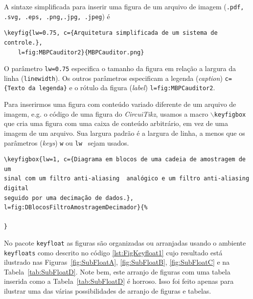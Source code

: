 {A sintaxe simplificada para inserir uma figura de um arquivo de imagem (\texttt{.pdf, .svg, .eps, .png,.jpg, .jpeg}) é
\begin{lstlisting}[language={[Latex]Tex},frame=single]
\keyfig{lw=0.75, c={Arquitetura simplificada de um sistema de controle.},
	l=fig:MBPCauditor2}{MBPCauditor.png}
 \end{lstlisting}

O parâmetro \texttt{lw=0.75} especifica o tamanho da figura em relação a largura da linha (\texttt{linewidth}). Os outros parâmetros  especificam a legenda (\emph{caption}) \texttt{c=\{Texto da legenda\}} e o rótulo da figura (\emph{label}) \texttt{l=fig:MBPCauditor2}.


Para inserirmos uma figura com conteúdo variado diferente de um arquivo de imagem, e.g. o código de uma figura do \emph{CircuiTikz}, usamos a macro \texttt{$\backslash$keyfigbox} que cria uma figura com uma caixa de conteúdo arbitrário, em vez de uma imagem de um arquivo. Sua largura padrão é a largura de linha, a menos que os parâmetros (\emph{keys}) \texttt{w} ou \texttt{lw } sejam usados.
\begin{lstlisting}[language={[Latex]Tex},frame=single,numbers =none]
\keyfigbox{lw=1, c={Diagrama em blocos de uma cadeia de amostragem de um
sinal com um filtro anti-aliasing  analógico e um filtro anti-aliasing digital 
seguido por uma decimação de dados.}, l=fig:DBlocosFiltroAmostragemDecimador}{%
	
}
\end{lstlisting}


No pacote \verb|keyfloat| as figuras são organizadas ou  arranjadas  usando  o ambiente \verb|keyfloats| como descrito no código \ref{lst:FigKeyfloat1} cujo resultado está ilustrado nas Figuras~\ref{fig:SubFloatA}, \ref{fig:SubFloatB}, \ref{fig:SubFloatC} e na Tabela~\ref{tab:SubFloatD}.  Note bem, este arranjo de figuras com uma tabela inserida como a Tabela~\ref{tab:SubFloatD} é horroso. Isso foi feito apenas para ilustrar uma das várias possibilidades de arranjo de figuras e tabelas.

}
